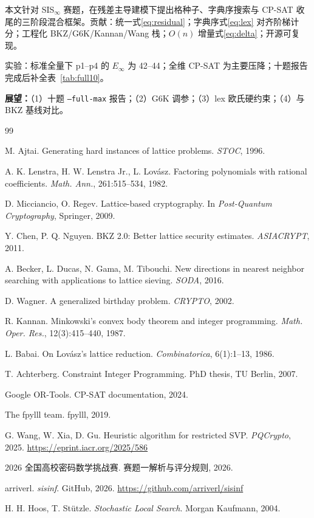 \documentclass[12pt,a4paper]{ctexart}
\newcommand{\refzi}{\zihao{5}}
\begin{document}
本文针对 SIS$_{\infty}$ 赛题，在残差主导建模下提出格种子、字典序搜索与 CP-SAT 收尾的三阶段混合框架\cite{sisinfrepo}。贡献：统一式\eqref{eq:residual}；字典序式\eqref{eq:lex} 对齐阶梯计分；工程化 BKZ/G6K/Kannan/Wang 栈；$O(n)$ 增量式\eqref{eq:delta}；开源可复现。

实验：标准全量下 p1--p4 的 $E_\infty$ 为 42--44；全维 CP-SAT 为主要压降；十题报告完成后补全表~\ref{tab:full10}。

\textbf{展望：}（1）十题 \texttt{--full-max} 报告；（2）G6K 调参；（3）lex 欧氏硬约束；（4）与 BKZ 基线对比。

\refzi
\begin{thebibliography}{99}

M. Ajtai. Generating hard instances of lattice problems. \emph{STOC}, 1996.

A. K. Lenstra, H. W. Lenstra Jr., L. Lov\'asz. Factoring polynomials with rational coefficients. \emph{Math. Ann.}, 261:515--534, 1982.

D. Micciancio, O. Regev. Lattice-based cryptography. In \emph{Post-Quantum Cryptography}, Springer, 2009.

Y. Chen, P. Q. Nguyen. BKZ 2.0: Better lattice security estimates. \emph{ASIACRYPT}, 2011.

A. Becker, L. Ducas, N. Gama, M. Tibouchi. New directions in nearest neighbor searching with applications to lattice sieving. \emph{SODA}, 2016.

D. Wagner. A generalized birthday problem. \emph{CRYPTO}, 2002.

R. Kannan. Minkowski's convex body theorem and integer programming. \emph{Math. Oper. Res.}, 12(3):415--440, 1987.

L. Babai. On Lov\'asz's lattice reduction. \emph{Combinatorica}, 6(1):1--13, 1986.

T. Achterberg. Constraint Integer Programming. PhD thesis, TU Berlin, 2007.

Google OR-Tools. CP-SAT documentation, 2024.

The fpylll team. fpylll, 2019.

G. Wang, W. Xia, D. Gu. Heuristic algorithm for restricted SVP. \emph{PQCrypto}, 2025. \url{https://eprint.iacr.org/2025/586}

2026 全国高校密码数学挑战赛. 赛题一解析与评分规则, 2026.

arriverl. \emph{sisinf}. GitHub, 2026. \url{https://github.com/arriverl/sisinf}

H. H. Hoos, T. St\"utzle. \emph{Stochastic Local Search}. Morgan Kaufmann, 2004.

\end{thebibliography}
\end{document}
